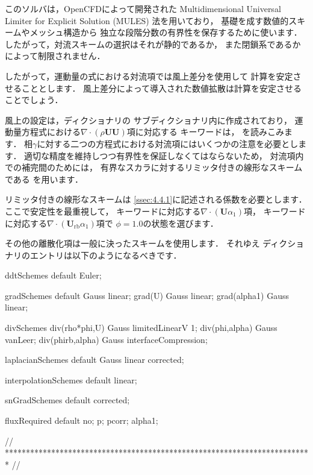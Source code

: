 このソルバは，OpenCFDによって開発された
Multidimensional Universal Limiter for Explicit Solution (MULES) 法を用いており，
基礎を成す数値的スキームやメッシュ構造から
独立な段階分数の有界性を保存するために使います．
したがって，対流スキームの選択はそれが静的であるか，
また閉鎖系であるかによって制限されません．

したがって，運動量の式における対流項では風上差分を使用して
計算を安定させることとします．
%
風上差分によって導入された数値拡散は計算を安定させることでしょう．

風上の設定は，ディクショナリの
サブディクショナリ内に作成されており，
運動量方程式における$\nabla \cdot (\rho\bm{U}\bm{U})$項に対応する
キーワードは，
を読みこみます．
相$\gamma$に対する二つの方程式における対流項にはいくつかの注意を必要とします．
適切な精度を維持しつつ有界性を保証しなくてはならないため，
対流項内での補完間のためには，
有界なスカラに対するリミッタ付きの線形なスキームである
を用います．

リミッタ付きの線形なスキームは
\autoref{ssec:4.4.1}に記述される係数を必要とします．
ここで安定性を最重視して，
キーワードに対応する$\nabla \cdot (\bm{U}\alpha_{1})$項，
キーワードに対応する$\nabla \cdot (\bm{U}_{\mathrm{rb}}\alpha_{1})$項で
$\phi = 1.0$の状態を選びます．

その他の離散化項は一般に決ったスキームを使用します．
それゆえ
%
%
ディクショナリのエントリは以下のようになるべきです．
\begin{OFverbatim}[file, linenum=17]

ddtSchemes
{
    default         Euler;
}

gradSchemes
{
    default         Gauss linear;
    grad(U)         Gauss linear;
    grad(alpha1)    Gauss linear;
}

divSchemes
{
    div(rho*phi,U)  Gauss limitedLinearV 1;
    div(phi,alpha)  Gauss vanLeer;
    div(phirb,alpha) Gauss interfaceCompression;
}

laplacianSchemes
{
    default         Gauss linear corrected;
}

interpolationSchemes
{
    default         linear;
}

snGradSchemes
{
    default         corrected;
}

fluxRequired
{
    default         no;
    p;
    pcorr;
    alpha1;
}


// ************************************************************************* //
\end{OFverbatim}



